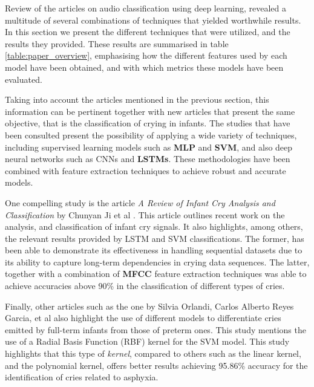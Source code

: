 Review of the articles on audio classification using deep learning, revealed a multitude of several combinations of techniques that yielded worthwhile results. In this section we present the different techniques that were utilized, and the results they provided. These results are summarised in table \ref{table:paper_overview}, emphasising how the different features used by each model have been obtained, and with which metrics these models have been evaluated. 

Taking into account the articles mentioned in the previous section, this information can be pertinent together with new articles that present the same objective, that is the classification of crying in infants. The studies that have been consulted present the possibility of applying a wide variety of techniques, including supervised learning models such as \textbf{MLP} and \textbf{SVM}, and also deep neural networks such as CNNs and \textbf{LSTMs}. These methodologies have been combined with feature extraction techniques to achieve robust and accurate models.

One compelling study is the article \textit{A Review of Infant Cry Analysis and Classification} by Chunyan Ji et al \cite{Ji2020}. This article outlines recent work on the analysis, and classification of infant cry signals. It also highlights, among others, the relevant results provided by LSTM and SVM classifications. The former, has been able to demonstrate its effectiveness in handling sequential datasets due to its ability to capture long-term dependencies in crying data sequences. The latter, together with a combination of \textbf{MFCC} feature extraction techniques was able to achieve accuracies above 90\% in the classification of different types of cries. 

Finally, other articles such as the one by Silvia Orlandi, Carlos Alberto Reyes Garcia, et al \cite{Orlandi2016} also highlight the use of different models to differentiate cries emitted by full-term infants from those of preterm ones. This study mentions the use of a Radial Basis Function (RBF) kernel for the SVM model. This study highlights that this type of \textit{kernel}, compared to others such as the linear kernel, and the polynomial kernel, offers better results achieving 95.86\% accuracy for the identification of cries related to asphyxia.


